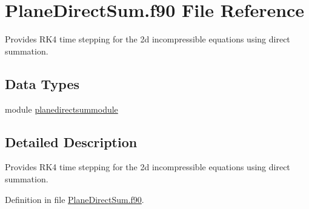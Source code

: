 \hypertarget{PlaneDirectSum_8f90}{\section{Plane\+Direct\+Sum.\+f90 File Reference}
\label{PlaneDirectSum_8f90}
}


Provides R\+K4 time stepping for the 2d incompressible equations using direct summation.  


\subsection*{Data Types}
\begin{DoxyCompactItemize}
\item 
module \hyperlink{classplanedirectsummodule}{planedirectsummodule}
\end{DoxyCompactItemize}


\subsection{Detailed Description}
Provides R\+K4 time stepping for the 2d incompressible equations using direct summation. 



Definition in file \hyperlink{PlaneDirectSum_8f90_source}{Plane\+Direct\+Sum.\+f90}.

